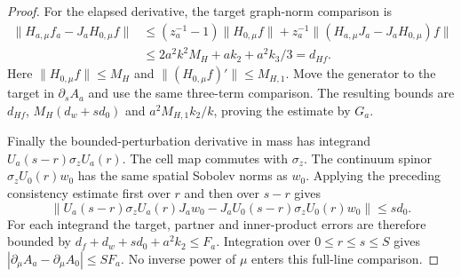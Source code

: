 \documentclass[11pt]{article}
\theoremstyle{definition}
\begin{document}
\begin{proof}
For the elapsed derivative, the target graph-norm comparison is
\begin{align*}
 \|H_{a,\mu}f_a-J_aH_{0,\mu}f\|
 &\le (z_a^{-1}-1)\|H_{0,\mu}f\|
      +z_a^{-1}\|(H_{a,\mu}J_a-J_aH_{0,\mu})f\|\\
 &\le2a^2k^2M_H+ak_2+a^2k_3/3=d_{Hf}.
\end{align*}
Here $\|H_{0,\mu}f\|\le M_H$ and
$\|(H_{0,\mu}f)'\|\le M_{H,1}$.
Move the generator to the target in $\partial_s A_a$ and use the same
three-term comparison. The resulting bounds are
$d_{Hf}$, $M_H(d_w+s d_0)$ and
$a^2M_{H,1}k_2/k$, proving the estimate by $G_a$.

Finally the bounded-perturbation derivative in mass has integrand
$U_a(s-r)\sigma_zU_a(r)$. The cell map commutes with $\sigma_z$.
The continuum spinor $\sigma_zU_0(r)w_0$ has the same spatial
Sobolev norms as $w_0$. Applying the preceding consistency estimate
first over $r$ and then over $s-r$ gives
\[
 \|U_a(s-r)\sigma_zU_a(r)J_aw_0
       -J_aU_0(s-r)\sigma_zU_0(r)w_0\|\le s d_0.
\]
For each integrand the target, partner and inner-product errors are
therefore bounded by $d_f+d_w+s d_0+a^2k_2\le F_a$.
Integration over $0\le r\le s\le S$ gives
$|\partial_\mu A_a-\partial_\mu A_0|\le SF_a$.
No inverse power of $\mu$ enters this full-line comparison.
\end{proof}
\end{document}
